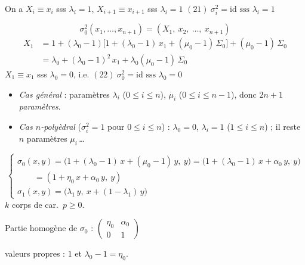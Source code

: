 \documentclass[11pt,a4paper]{article}
\begin{document}
On a $X_i \equiv x_i$ sss $\lambda_i = 1$, $X_{i+1} \equiv x_{i+1}$ sss $\lambda_i = 1$ \quad
$(21)\ \boxed{\sigma_i^2 = \mathrm{id} \text{ sss } \lambda_i = 1}$

\ill{}
\[
\sigma_0^2(x_1,\dots,x_{n+1}) = (X_1,\ x_2,\ \dots,\ x_{n+1})
\]
\[
\begin{aligned}
X_1 &= 1 + (\lambda_0-1)\bigl[1 + (\lambda_0-1)\,x_1 + (\mu_0-1)\,\Sigma_0\bigr] + (\mu_0-1)\,\Sigma_0\\
&= \lambda_0 + (\lambda_0-1)^2\,x_1 + \lambda_0(\mu_0-1)\,\Sigma_0
\end{aligned}
\]
$X_1 \equiv x_1$ sss $\lambda_0 = 0$, i.e. \quad $(22)\ \boxed{\sigma_0^2 = \mathrm{id} \text{ sss } \lambda_0 = 0}$

\begin{itemize}
\item \emph{Cas général} : paramètres $\lambda_i$ ($0\le i\le n$), $\mu_i$ ($0\le i\le n-1$), donc \emph{$2n+1$ paramètres}.
\item \emph{Cas $n$-polyèdral} ($\sigma_i^2 = 1$ pour $0\le i\le n$) : $\lambda_0 = 0$, $\lambda_i = 1$ ($1\le i\le n$) ; il reste $n$ paramètres $\mu_i$\,\ldots
\end{itemize}

\[
\begin{cases}
\sigma_0(x,y) = \bigl(1 + (\lambda_0-1)\,x + (\mu_0-1)\,y,\ y\bigr) = \bigl(1 + (\lambda_0-1)\,x + \alpha_0\,y,\ y\bigr)\\
\qquad = (1 + \eta_0\,x + \alpha_0\,y,\ y)\\
\sigma_1(x,y) = \bigl(\lambda_1\,y,\ x + (1-\lambda_1)\,y\bigr)
\end{cases}
\]
$k$ corps de car.\ $p \ge 0$.

Partie homogène de $\sigma_0$ : $\begin{pmatrix}\eta_0 & \alpha_0\\ 0 & 1\end{pmatrix}$

 valeurs propres : $1$ et $\lambda_0 - 1 = \eta_0$.
\end{document}

